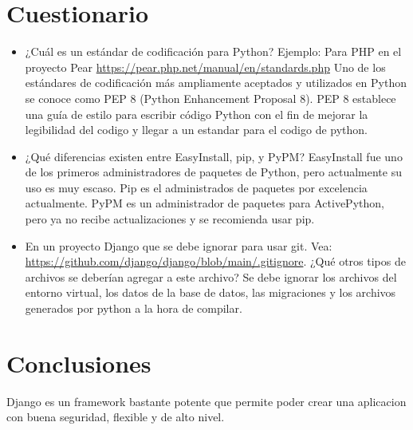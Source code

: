 \documentclass{article}
\begin{document}
\section{Cuestionario}
	\begin{itemize}
		\item{¿Cuál es un estándar de codificación para Python? Ejemplo: Para PHP en el proyecto Pear \url{https://pear.php.net/manual/en/standards.php}}
        Uno de los estándares de codificación más ampliamente aceptados y utilizados en Python se conoce como PEP 8 (Python Enhancement Proposal 8). PEP 8 establece una guía de estilo para escribir código Python con el fin de mejorar la legibilidad del codigo y llegar a un estandar para el codigo de python.\newline

		\item{¿Qué diferencias existen entre EasyInstall, pip, y PyPM?}\newline
        EasyInstall fue uno de los primeros administradores de paquetes de Python, pero actualmente su uso es muy escaso. Pip es el administrados de paquetes por excelencia actualmente. PyPM es un administrador de paquetes para ActivePython, pero ya no recibe actualizaciones y se recomienda usar pip.  \newline

\item{En un proyecto Django que se debe ignorar para usar git. Vea: \url{https://github.com/django/django/blob/main/.gitignore}. ¿Qué otros tipos de archivos se deberían agregar a este archivo?}\newline
  Se debe ignorar los archivos del entorno virtual, los datos de la base de datos, las migraciones y los archivos generados por python a la hora de compilar.
  
	\end{itemize}	
 \newpage
 \section{Conclusiones}
	\begin{itemize}
    Django es un framework bastante potente que permite poder crear una aplicacion con buena seguridad, flexible y de alto nivel.
	\end{itemize}	
\clearpage
\end{document}
